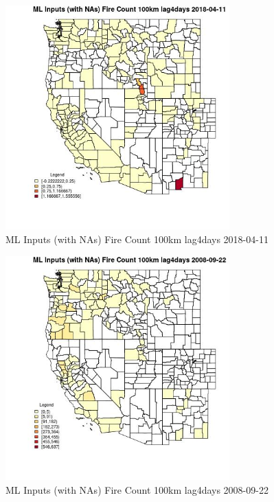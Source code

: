 \begin{figure} 
\centering  
\includegraphics[width=0.77\textwidth]{Code_Outputs/Report_ML_input_PM25_Step4_part_e_de_duplicated_aves_compiled_2019-05-18wNAs_CountyFire_Count_100km_lag4daysMean2018-04-11.jpg} 
\caption{\label{fig:Report_ML_input_PM25_Step4_part_e_de_duplicated_aves_compiled_2019-05-18wNAsCountyFire_Count_100km_lag4daysMean2018-04-11}ML Inputs (with NAs) Fire Count 100km lag4days 2018-04-11} 
\end{figure} 
 

\begin{figure} 
\centering  
\includegraphics[width=0.77\textwidth]{Code_Outputs/Report_ML_input_PM25_Step4_part_e_de_duplicated_aves_compiled_2019-05-18wNAs_CountyFire_Count_100km_lag4daysMean2008-09-22.jpg} 
\caption{\label{fig:Report_ML_input_PM25_Step4_part_e_de_duplicated_aves_compiled_2019-05-18wNAsCountyFire_Count_100km_lag4daysMean2008-09-22}ML Inputs (with NAs) Fire Count 100km lag4days 2008-09-22} 
\end{figure} 
 

